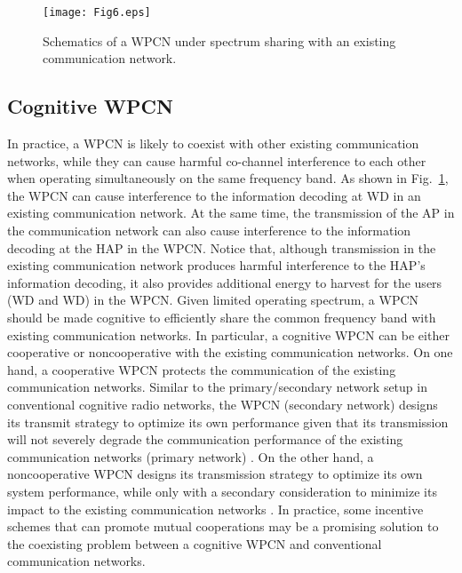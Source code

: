 \documentclass[journal, draftcls, one column, 12pt]{IEEEtran}
\begin{document}
\begin{figure}
\centering
  \begin{center}
    \texttt{[image: Fig6.eps]}
  \end{center}
  \caption{Schematics of a WPCN under spectrum sharing with an existing communication network.}
  \label{76}
\end{figure}

\subsection{Cognitive WPCN}
In practice, a WPCN is likely to coexist with other existing communication networks, while they can cause harmful co-channel interference to each other when operating simultaneously on the same frequency band. As shown in Fig.~\ref{76}, the WPCN can cause interference to the information decoding at WD in an existing communication network. At the same time, the transmission of the AP in the communication network can also cause interference to the information decoding at the HAP in the WPCN. Notice that, although transmission in the existing communication network produces harmful interference to the HAP's information decoding, it also provides additional energy to harvest for the users (WD and WD) in the WPCN. Given limited operating spectrum, a WPCN should be made cognitive to efficiently share the common frequency band with existing communication networks. In particular, a cognitive WPCN can be either cooperative or noncooperative with the existing communication networks. On one hand, a cooperative WPCN protects the communication of the existing communication networks. Similar to the primary/secondary network setup in conventional cognitive radio networks, the WPCN (secondary network) designs its transmit strategy to optimize its own performance given that its transmission will not severely degrade the communication performance of the existing communication networks (primary network) \cite{2015:Lee}. On the other hand, a noncooperative WPCN designs its transmission strategy to optimize its own system performance, while only with a secondary consideration to minimize its impact to the existing communication networks \cite{2015:Xu}. In practice, some incentive schemes that can promote mutual cooperations may be a promising solution to the coexisting problem between a cognitive WPCN and conventional communication networks.
\end{document}
